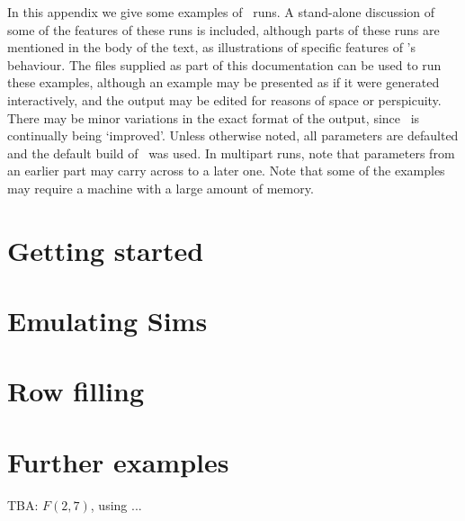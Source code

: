 
%
%

In this appendix we give some examples of \ace\ runs.
A stand-alone discussion of some of the features of these runs is included,
  although parts of these runs are mentioned in the body of the text, as 
  illustrations of specific features of \ace's behaviour.
The  files supplied as part of this documentation can be
  used to run these examples, although an example may be presented as if it
  were generated interactively, and the output may be edited for reasons of
  space or perspicuity.
There may be minor variations in the exact format of the output, since
  \ace\ is continually being `improved'\kern-1pt.
Unless otherwise noted, all parameters are defaulted and the default
  build of \ace\ was used.
In multipart runs, note that parameters from an earlier part may carry
  across to a later one.
Note that some of the examples may require a machine with a large amount
  of memory.

\section{Getting started}\label{ex000}


\section{Emulating Sims}\label{ex001}


\section{Row filling}\label{ex002}


\section{Further examples}

TBA: $F(2,7)$, using  \amp {} ...
